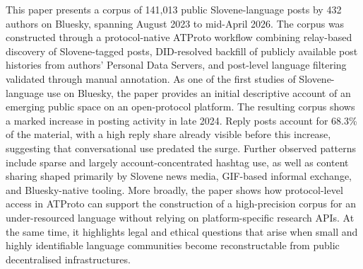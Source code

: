This paper presents a corpus of 141,013 public Slovene-language posts by 432 authors on Bluesky, spanning August 2023 to mid-April 2026. The corpus was constructed through a protocol-native ATProto workflow combining relay-based discovery of Slovene-tagged posts, DID-resolved backfill of publicly available post histories from authors' Personal Data Servers, and post-level language filtering validated through manual annotation. As one of the first studies of Slovene-language use on Bluesky, the paper provides an initial descriptive account of an emerging public space on an open-protocol platform. The resulting corpus shows a marked increase in posting activity in late 2024. Reply posts account for 68.3\% of the material, with a high reply share already visible before this increase, suggesting that conversational use predated the surge. Further observed patterns include sparse and largely account-concentrated hashtag use, as well as content sharing shaped primarily by Slovene news media, GIF-based informal exchange, and Bluesky-native tooling. More broadly, the paper shows how protocol-level access in ATProto can support the construction of a high-precision corpus for an under-resourced language without relying on platform-specific research APIs. At the same time, it highlights legal and ethical questions that arise when small and highly identifiable language communities become reconstructable from public decentralised infrastructures.

